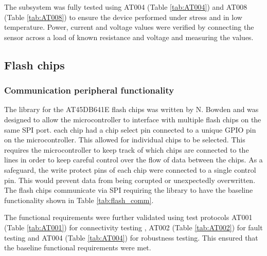 The subsystem was fully tested using AT004 (Table \ref{tab:AT004}) and AT008 (Table \ref{tab:AT008}) to ensure the device performed under stress and in low temperature. Power,  current and voltage values were verified by connecting the sensor across a load of known resistance and voltage and measuring the values.
\subsection{Flash chips}

\subsubsection{Communication peripheral functionality}
The library for the AT45DB641E flash chips was written by N. Bowden and was designed to allow the microcontroller to interface with multiple flash chips on the same SPI port. each chip had a chip select pin connected to a unique GPIO pin on the microcontroller. This allowed for individual chips to be selected. This requires the microcontroller to keep track of which chips are connected to the lines in order to keep careful control over the flow of data between the chips. As a safeguard, the write protect pins of each chip were connected to a single control pin. This would prevent data from being corupted or unexpectedly overwritten. The flash chips communicate via SPI requiring the library to have the baseline functionality shown in Table \ref{tab:flash_comm}.

\begin{table}[H]
	\centering
	\caption{Baseline functionality of the AT45DB641E flash chips SPI  communication peripheral of the firmware and the tests used to verify unit functionality.}
	\label{tab:flash_comm}
	\setlength{\extrarowheight}{5pt}


\end{table}
The functional requirements were further validated using test protocols AT001 (Table \ref{tab:AT001}) for connectivity testing , AT002 (Table \ref{tab:AT002})  for fault testing and AT004 (Table \ref{tab:AT004}) for robustness testing. This ensured that the baseline functional requirements were met.


